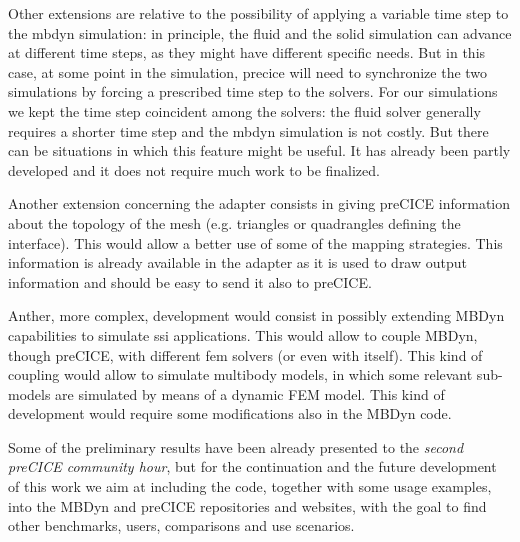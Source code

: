 Other extensions are relative to the possibility of applying a variable time step to the \acrshort{mbdyn} simulation: in principle, the fluid and the solid simulation can advance at different time steps, as they might have different specific needs. But in this case, at some point in the simulation, \acrshort{precice} will need to synchronize the two simulations by forcing a prescribed time step to the solvers. For our simulations we kept the time step coincident among the solvers: the fluid solver generally requires a shorter time step and the \acrshort{mbdyn} simulation is not costly. But there can be situations in which this feature might be useful. It has already been partly developed and it does not require much work to be finalized.

Another extension concerning the adapter consists in giving preCICE information about the topology of the mesh (e.g. triangles or quadrangles defining the interface). This would allow a better use of some of the mapping strategies. This information is already available in the adapter as it is used to draw output information and should be easy to send it also to preCICE.

Anther, more complex, development would consist in possibly extending MBDyn capabilities to simulate \acrfull{ssi} applications. This would allow to couple MBDyn, though preCICE, with different \acrshort{fem} solvers (or even with itself). This kind of coupling would allow to simulate multibody models, in which some relevant sub-models are simulated by means of a dynamic FEM model. This kind of development would require some modifications also in the MBDyn code.

Some of the preliminary results have been already presented to the \textit{second preCICE community hour}, but for the continuation and the future development of this work we aim at including the code, together with some usage examples, into the MBDyn and preCICE repositories and websites, with the goal to find other benchmarks, users, comparisons and use scenarios.


